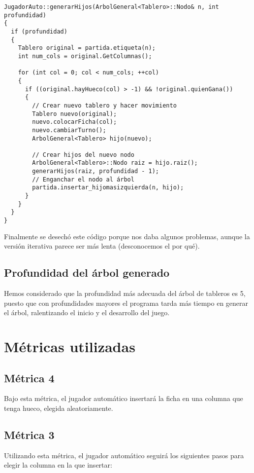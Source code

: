 \documentclass[11pt]{article}
\begin{document}
\begin{verbatim}
JugadorAuto::generarHijos(ArbolGeneral<Tablero>::Nodo& n, int profundidad)
{
  if (profundidad)
  {
    Tablero original = partida.etiqueta(n);
    int num_cols = original.GetColumnas();

    for (int col = 0; col < num_cols; ++col)
    {
      if ((original.hayHueco(col) > -1) && !original.quienGana())
      {
        // Crear nuevo tablero y hacer movimiento
        Tablero nuevo(original);
        nuevo.colocarFicha(col);
        nuevo.cambiarTurno();
        ArbolGeneral<Tablero> hijo(nuevo);

        // Crear hijos del nuevo nodo
        ArbolGeneral<Tablero>::Nodo raiz = hijo.raiz();
        generarHijos(raiz, profundidad - 1);
        // Enganchar el nodo al árbol
        partida.insertar_hijomasizquierda(n, hijo);
      }
    }
  }
}
\end{verbatim}

Finalmente se desechó este código porque nos daba algunos problemas, aunque la
versión iterativa parece ser más lenta (desconocemos el por qué).

\subsection{Profundidad del árbol generado}
\label{sec-1-4}

Hemos considerado que la profundidad más adecuada del árbol de tableros es 5,
puesto que con profundidades mayores el programa tarda más tiempo en generar el
árbol, ralentizando el inicio y el desarrollo del juego.

\section{Métricas utilizadas}
\label{sec-2}

\subsection{Métrica 4}
\label{sec-2-1}

Bajo esta métrica, el jugador automático insertará la ficha en una columna que tenga hueco, elegida aleatoriamente.

\subsection{Métrica 3}
\label{sec-2-2}

Utilizando esta métrica, el jugador automático seguirá los siguientes pasos para elegir la columna en la que insertar:
\end{document}
